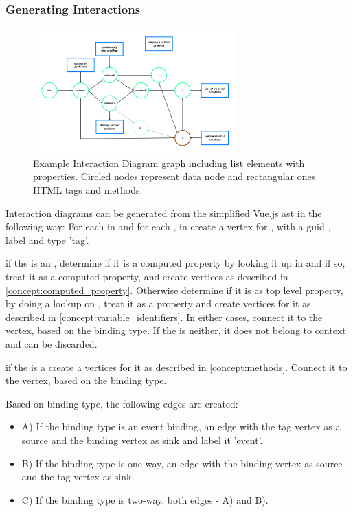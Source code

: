 \subsubsection{Generating Interactions}
\label{concept:algorithm_create_diagrams}
\begin{figure}[H]
    \centering
    \includegraphics[width=0.7\textwidth]{images/graph_complete_example.png}
     \caption{Example Interaction Diagram graph including list elements with properties. Circled nodes represent data node and rectangular ones HTML tags and methods.}
     \label{fig:graph_complete_example}
\end{figure}

Interaction diagrams can be generated from the simplified Vue.js \gls{ast} in the following way:
For each  in  and for each ,   in  create a vertex for , with a \gls{guid} , label  and type 'tag'.

if the  is an , determine if it is a computed property by looking it up in  and if so, treat it as a computed property, and create vertices as described in \ref{concept:computed_property}. Otherwise determine if it is as top level property, by doing a lookup on , treat it as a property and create vertices for it as described in \ref{concept:variable_identifiers}. In either cases, connect it to the  vertex, based on the binding type. If the  is neither, it does not belong to context and can be discarded. %

if the  is a  create a vertices for it as described in \ref{concept:methods}. Connect it to the  vertex, based on the binding type.

Based on binding type, the following edges are created:
\begin{itemize}
    \item A) If the binding type is an event binding, an 
edge with the tag vertex as a source and the binding vertex as sink and label it 'event'. 
\item B) If the binding type is one-way, an edge with the binding vertex as source and the tag vertex as sink.
\item C) If the binding type is two-way, both edges - A) and B).
\end{itemize}

